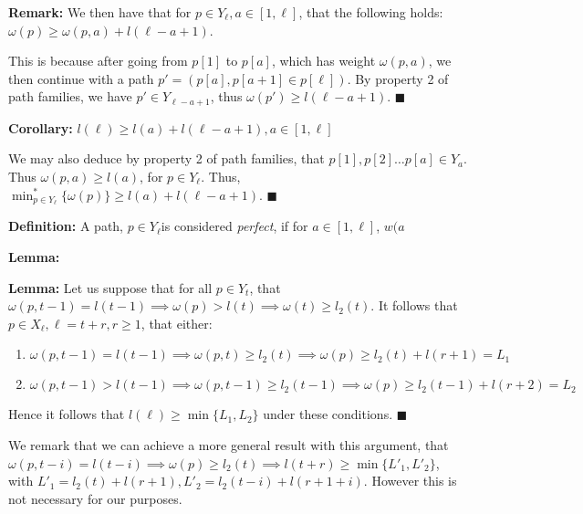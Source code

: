 \documentclass{article}
\newcommand{\edit}[1]{}%
\begin{document}
{\textbf{Remark:} We then have that for $p \in Y_\ell, a \in [1,\ell]$, that the following holds: $\omega(p) \geq \omega(p,a)+l(\ell-a+1)$.

This is because after going from $p[1]$ to $p[a]$, which has weight $\omega(p,a)$, we then continue with a path $p' = (p[a], p[a+1] \in p[\ell])$. By property 2 of path families, we have  $p' \in Y_{\ell-a+1}$, thus $\omega(p') \geq l(\ell-a+1)$. $\blacksquare$

\textbf{Corollary:} $l(\ell) \geq l(a) + l(\ell-a+1), a \in [1,\ell]$

We may also deduce by property 2 of path families, that $p[1], p[2] \dots p[a] \in Y_a$. Thus $\omega(p,a) \geq l(a)$, for $p \in Y_\ell$. Thus, $\min^*_{p\in Y_\ell}\{\omega(p)\} \geq l(a) +l(\ell-a+1)$. $\blacksquare$

\vspace{1.75em}

\textbf{Definition:} A path, $p \in Y_\ell$is considered \textit{perfect}, if for $a \in [1,\ell]$, $w(a$

\textbf{Lemma:}

\vspace{1.75em}

\textbf{Lemma:} Let us suppose that for all $p \in Y_t$, that $\omega(p,t-1) = l(t-1) \implies \omega(p) > l(t) \implies \omega(t) \geq l_2(t)$. It follows that $p \in X_\ell, \ell = t+r, r \geq 1$, that either:

\begin{enumerate}
    \item $\omega(p,t-1) = l(t-1) \implies \omega(p,t) \geq l_2(t) \implies \omega(p) \geq l_2(t) + l(r+1) = L_1$
    \item $\omega(p,t-1) > l(t-1) \implies \omega(p,t-1) \geq l_2(t-1) \implies \omega(p) \geq l_2(t-1)+ l(r+2) = L_2$
\end{enumerate}

Hence it follows that $l(\ell) \geq \min\{L_1,L_2\}$ under these conditions. $\blacksquare$\edit{ clean out the excessive logic; make lemma result more clear}

We remark that we can achieve a more general result with this argument, that $\omega(p,t-i) = l(t-i) \implies \omega(p) \geq l_2(t) \implies l(t+r) \geq \min \{ L'_1, L'_2\}$, with $L'_1 = l_2(t) + l(r+1), L'_2 = l_2(t-i)+l(r+1+i)$. However this is not necessary for our purposes.\edit{ placement; maybe just merge with above}

\vspace{1.75em}

}
\end{document}
